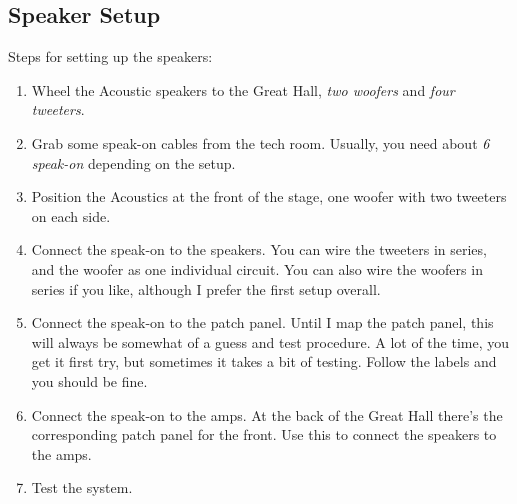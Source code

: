 \documentclass[letterpaper,10pt,oneside,headsepline]{scrreprt}
\begin{document}
\subsection{Speaker Setup}

Steps for setting up the speakers:
\begin{enumerate}
\item Wheel the Acoustic speakers to the Great Hall, \textit{two woofers} and \textit{four tweeters}.
\item Grab some speak-on cables from the tech room. Usually, you need about \textit{6 speak-on} depending on the setup.
\item Position the Acoustics at the front of the stage, one woofer with two tweeters on each side.
\item Connect the speak-on to the speakers. You can wire the tweeters in series, and the woofer as one individual circuit. You can also wire the woofers in series if you like, although I prefer the first setup overall.
\item Connect the speak-on to the patch panel. Until I map the patch panel, this will always be somewhat of a guess and test procedure. A lot of the time, you get it first try, but sometimes it takes a bit of testing. Follow the labels and you should be fine.
\item Connect the speak-on to the amps. At the back of the Great Hall there's the corresponding patch panel for the front. Use this to connect the speakers to the amps.
\item Test the system.
\end{enumerate} 
\end{document}
